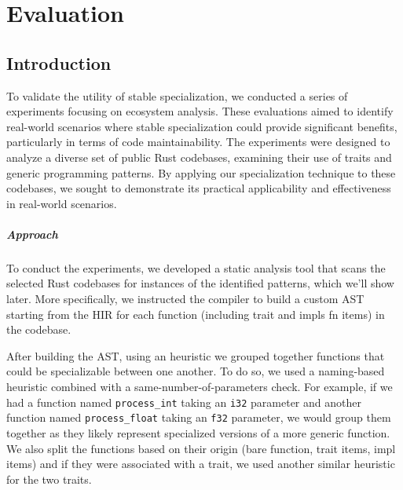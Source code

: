 \chapter{Evaluation}\label{chap:evaluation}


\section{Introduction}\label{sec:evaluation-introduction}
To validate the utility of stable specialization, we conducted a series of experiments focusing on ecosystem analysis.
These evaluations aimed to identify real-world scenarios where stable specialization could provide significant benefits, particularly in terms of code maintainability.
The experiments were designed to analyze a diverse set of public Rust codebases, examining their use of traits and generic programming patterns.
By applying our specialization technique to these codebases, we sought to demonstrate its practical applicability and effectiveness in real-world scenarios.

\paragraph{Approach}
To conduct the experiments, we developed a static analysis tool that scans the selected Rust codebases for instances of the identified patterns, which we'll show later.
More specifically, we instructed the compiler to build a custom AST starting from the HIR for each function (including trait and impls fn items) in the codebase.

After building the AST, using an heuristic we grouped together functions that could be specializable between one another.
To do so, we used a naming-based heuristic combined with a same-number-of-parameters check.
For example, if we had a function named \texttt{process\_int} taking an \texttt{i32} parameter and another function named \texttt{process\_float} taking an \texttt{f32} parameter, we would group them together as they likely represent specialized versions of a more generic function.
We also split the functions based on their origin (bare function, trait items, impl items) and if they were associated with a trait, we used another similar heuristic for the two traits.

